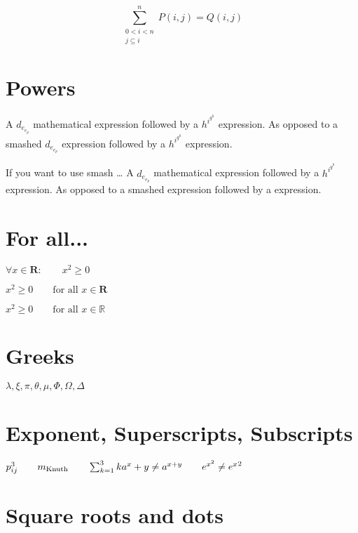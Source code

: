 \documentclass{article}
\begin{document}
 \begin{equation}
\sum^n_{\substack{0<i<n \\
        j\subseteq i}}
   P(i,j) = Q(i,j)
\end{equation}

\section{Powers}

A $d_{e_{e_p}}$ mathematical
expression  followed by a
$h^{i^{g^h}}$ expression. As
opposed to a smashed
{$d_{e_{e_p}}$} expression
followed by a {$h^{i^{g^h}}$} expression.\newline

\noindent If you want to use smash \ldots \newline
A $d_{e_{e_p}}$ mathematical
expression  followed by a
$h^{i^{g^h}}$ expression. As
opposed to a smashed
 expression
followed by a
 expression.

\section{For all...}

$\forall x \in \mathbf{R}:
 \qquad x^{2} \geq 0$

\bigskip
\noindent $x^{2} \geq 0\qquad
 \text{for all }x\in\mathbf{R}$

\bigskip
\noindent $x^{2} \geq 0\qquad
 \text{for all } x
 \in \mathbb{R}$

\section{Greeks}
\begin{center}
$\lambda,\xi,\pi,\theta,
 \mu,\Phi,\Omega,\Delta$
\end{center}

\section{Exponent, Superscripts, Subscripts}

$p^3_{ij} \qquad
 m_\text{Knuth}\qquad
\sum_{k=1}^3 k \\[5pt]
 a^x+y \neq a^{x+y}\qquad
 e^{x^2} \neq {e^x}^2$

\section{Square roots and dots}
\end{document}
